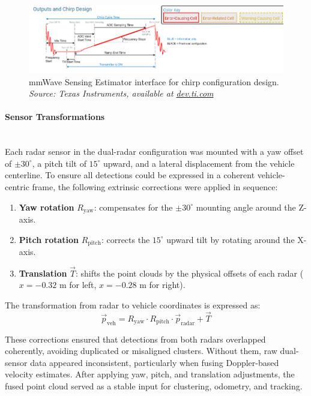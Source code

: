 \begin{figure}[!htbp]
    \centering
    \includegraphics[width=0.9\linewidth]{images/sensingEstimatorChirp.png}
    \caption{mmWave Sensing Estimator interface for chirp configuration design.\\
    \textit{Source: Texas Instruments, available at \href{https://dev.ti.com/gallery/view/mmwave/mmWaveSensingEstimator/ver/2.5.1/}{dev.ti.com}}}
    \label{fig:mmwave_sensing_estimator}
\end{figure}
\vspace{0.5em}
\paragraph{Sensor Transformations}
\hfill
\\
Each radar sensor in the dual-radar configuration was mounted with a yaw offset of $\pm30^\circ$, a pitch tilt of $15^\circ$ upward, and a lateral displacement from the vehicle centerline.  
To ensure all detections could be expressed in a coherent vehicle-centric frame, the following extrinsic corrections were applied in sequence:

\begin{enumerate}
    \item \textbf{Yaw rotation} $R_{\text{yaw}}$: compensates for the $\pm30^\circ$ mounting angle around the Z-axis.  
    \item \textbf{Pitch rotation} $R_{\text{pitch}}$: corrects the $15^\circ$ upward tilt by rotating around the X-axis.  
    \item \textbf{Translation} $\vec{T}$: shifts the point clouds by the physical offsets of each radar ($x=-0.32$ m for left, $x=-0.28$ m for right).
\end{enumerate}

The transformation from radar to vehicle coordinates is expressed as:
\begin{equation}
    \vec{p}_{\text{veh}} = R_{\text{yaw}} \cdot R_{\text{pitch}} \cdot \vec{p}_{\text{radar}} + \vec{T}
    \label{eq:radar_to_vehicle_transform_short}
\end{equation}

These corrections ensured that detections from both radars overlapped coherently, avoiding duplicated or misaligned clusters.  
Without them, raw dual-sensor data appeared inconsistent, particularly when fusing Doppler-based velocity estimates.  
After applying yaw, pitch, and translation adjustments, the fused point cloud served as a stable input for clustering, odometry, and tracking.

